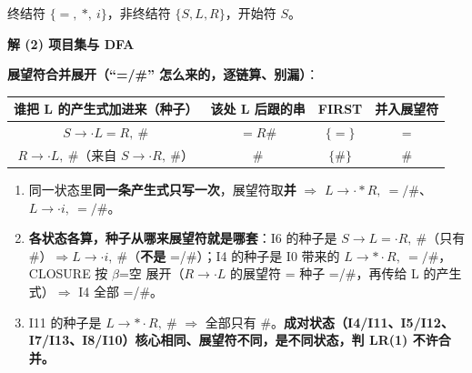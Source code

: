 \documentclass[12pt,a4paper,fontset=windows]{ctexart}
\newcommand{\imp}{\ensuremath{\Rightarrow}}
\begin{document}
终结符 $\{=,\ *,\ i\}$，非终结符 $\{S,L,R\}$，开始符 $S$。

\textbf{解 (2) 项目集与 DFA}

\textbf{展望符合并展开（``=/\#'' 怎么来的，逐链算、别漏）}：

\begin{center}
\renewcommand{\arraystretch}{1.25}
\begin{tabular}{c c c c}
\toprule
\textbf{谁把 L 的产生式加进来（种子）} & \textbf{该处 L 后跟的串} & \textbf{FIRST} & \textbf{并入展望符} \\
\midrule
$S \to \cdot L=R,\ \#$ & $=R\#$ & $\{=\}$ & $=$ \\
$R \to \cdot L,\ \#$（来自 $S \to \cdot R,\ \#$） & $\#$ & $\{\#\}$ & $\#$ \\
\bottomrule
\end{tabular}
\end{center}

\begin{enumerate}
\item 同一状态里\textbf{同一条产生式只写一次}，展望符取\textbf{并} \imp{} $L \to \cdot *R,\ =/\#$、$L \to \cdot i,\ =/\#$。
\item \textbf{各状态各算，种子从哪来展望符就是哪套}：I6 的种子是 $S \to L=\cdot R,\ \#$（只有 \#）$\Rightarrow L \to \cdot i,\ \#$（\textbf{不是} =/\#）；I4 的种子是 I0 带来的 $L \to *\cdot R,\ =/\#$，CLOSURE 按 $\beta$=空 展开（$R \to \cdot L$ 的展望符 = 种子 =/\#，再传给 L 的产生式）\imp{} I4 全部 =/\#。
\item I11 的种子是 $L \to *\cdot R,\ \#$ \imp{} 全部只有 \#。\textbf{成对状态（I4/I11、I5/I12、I7/I13、I8/I10）核心相同、展望符不同，是不同状态，判 LR(1) 不许合并。}
\end{enumerate}
\end{document}
